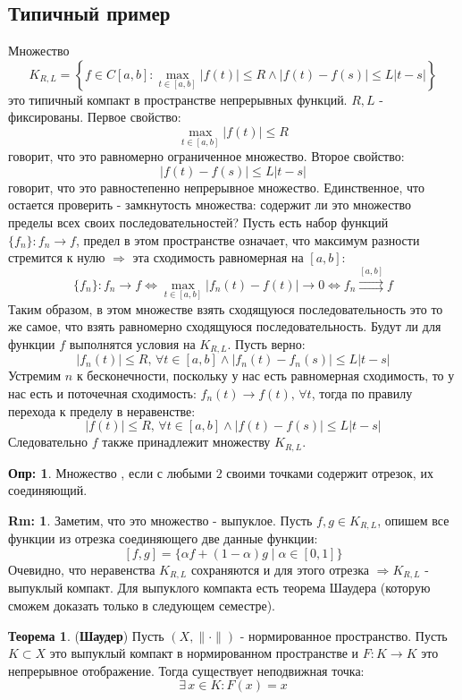 \documentclass[12pt]{article}
\theoremstyle{definition}
\newtheorem{defn}{Опр:}
\newtheorem{rem}{Rm:}
\newtheorem{theorem}{Теорема}
\newcommand{\uconv}[1]{\overset{#1}{\rightrightarrows}}
\begin{document}
\subsection*{Типичный пример}
Множество 
$$
	K_{R,L} = \left\{f \in C[a,b] \colon \max\limits_{t \in [a,b]}|f(t)|\leq R \wedge |f(t) - f(s)| \leq L|t-s|\right\}
$$
это типичный компакт в пространстве непрерывных функций. $R,L$ - фиксированы.
Первое свойство: 
$$
	\max\limits_{t \in [a,b]}|f(t)|\leq R
$$ 
говорит, что это равномерно ограниченное множество. Второе свойство:
$$
	|f(t) - f(s)| \leq L|t-s|
$$
говорит, что это равностепенно непрерывное множество. Единственное, что остается проверить - замкнутость множества: содержит ли это множество пределы всех своих последовательностей? Пусть есть набор функций $\{f_n\} \colon f_n \to f$, предел в этом пространстве означает, что максимум разности стремится к нулю $\Rightarrow$ эта сходимость равномерная на $[a,b]$:
$$
	\{f_n\}\colon f_n \to f \Leftrightarrow \max\limits_{t \in [a,b]}|f_n(t) - f(t)| \to 0 \Leftrightarrow f_n \uconv{[a,b]}f
$$
Таким образом, в этом множестве взять сходящуюся последовательность это то же самое, что взять равномерно сходящуюся последовательность. Будут ли для функции $f$ выполнятся условия на $K_{R,L}$. Пусть верно:
$$
	|f_n(t)| \leq R, \,	\forall t \in [a,b] \wedge |f_n(t) - f_n(s)| \leq L |t-s|
$$
Устремим $n$ к бесконечности, поскольку у нас есть равномерная сходимость, то у нас есть и поточечная сходимость: $f_n(t) \to f(t), \, \forall t$, тогда по правилу перехода к пределу в неравенстве:
$$
	|f(t)| \leq R, \,	\forall t \in [a,b] \wedge |f(t) - f(s)| \leq L |t-s|
$$
Следовательно $f$ также принадлежит множеству $K_{R,L}$. 

\begin{defn}
	Множество , если с любыми $2$ своими точками содержит отрезок, их соединяющий.
\end{defn}
\begin{rem}
	Заметим, что это множество - выпуклое. Пусть $f,g \in K_{R,L}$, опишем все функции из отрезка соединяющего две данные функции:
	$$
		[f,g] = \{\alpha f + (1- \alpha)g \mid \alpha \in [0,1]\}
	$$
	Очевидно, что неравенства $K_{R,L}$ сохраняются и для этого отрезка $\Rightarrow K_{R,L}$ - выпуклый компакт. Для выпуклого компакта есть теорема Шаудера (которую сможем доказать только в следующем семестре).
\end{rem}

\begin{theorem}(\textbf{Шаудер})
	Пусть $(X, \|{\cdot}\|)$ - нормированное пространство. Пусть $K\subset X$ это выпуклый компакт в нормированном пространстве и $F \colon K \to K$ это непрерывное отображение. Тогда существует неподвижная точка:
	$$
		\exists \, x \in K \colon F(x) = x
	$$
\end{theorem}
\end{document}
